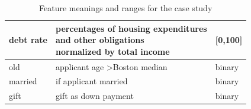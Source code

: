 \documentclass[mnsc,blindrev]{informs3}
\begin{document}
\begin{table}[ht!]
\begin{tabular}{|l|l|l|}
            debt rate           & \makecell{percentages of housing expenditures \\ and other obligations \\ normalized by total income}    & {[}0,100{]}                   \\ \hline
            old              & applicant age \textgreater Boston median & binary                        \\ \hline
            married          & if applicant married               & binary                        \\ \hline
            gift             & gift as down payment               & binary                         \\
            \hline
            \end{tabular}
            \caption{Feature meanings and ranges for the case study}
            \label{tab:case_study_features}
        \end{table}


\end{document}
